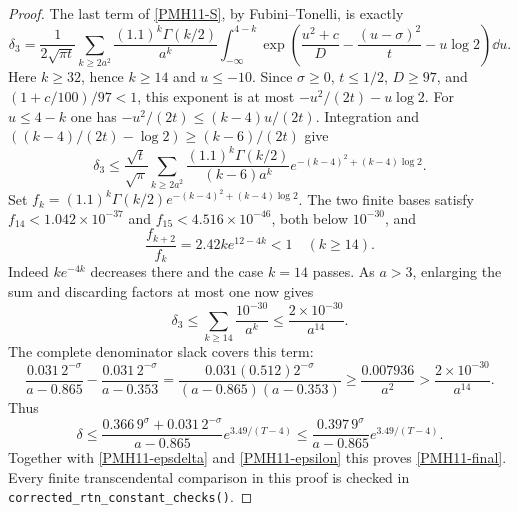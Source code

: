 \begin{proof}
The last term of \eqref{PMH11-S}, by Fubini--Tonelli, is exactly
\[
 \delta_3=\frac1{2\sqrt{\pi t}}
 \sum_{k\ge2a^2}\frac{(1.1)^k\Gamma(k/2)}{a^k}
 \int_{-\infty}^{4-k}
 \exp\left(\frac{u^2+c}{D}-\frac{(u-\sigma)^2}{t}
                          -u\log2\right)\dd u.
\]
Here $k\ge32$, hence $k\ge14$ and $u\le-10$. Since
$\sigma\ge0$, $t\le1/2$, $D\ge97$, and
$(1+c/100)/97<1$, this exponent is at most
$-u^2/(2t)-u\log2$. For $u\le4-k$ one has
$-u^2/(2t)\le(k-4)u/(2t)$. Integration and
$((k-4)/(2t)-\log2)\ge(k-6)/(2t)$ give
\[
 \delta_3\le\frac{\sqrt t}{\sqrt\pi}
 \sum_{k\ge2a^2}\frac{(1.1)^k\Gamma(k/2)}{(k-6)a^k}
            e^{-(k-4)^2+(k-4)\log2}.
\]
Set $f_k=(1.1)^k\Gamma(k/2)e^{-(k-4)^2+(k-4)\log2}$.
The two finite bases satisfy $f_{14}<1.042\times10^{-37}$ and
$f_{15}<4.516\times10^{-46}$, both below $10^{-30}$, and
\[
 \frac{f_{k+2}}{f_k}=2.42k e^{12-4k}<1\quad(k\ge14).
\]
Indeed $k e^{-4k}$ decreases there and the case $k=14$ passes.
As $a>3$, enlarging the sum and discarding factors at most one
now gives
\begin{equation}\label{PMH11-delta3}
 \delta_3\le\sum_{k\ge14}\frac{10^{-30}}{a^k}
       \le\frac{2\times10^{-30}}{a^{14}}.
\end{equation}
The complete denominator slack covers this term:
\[
 \frac{0.031\,2^{-\sigma}}{a-0.865}
 -\frac{0.031\,2^{-\sigma}}{a-0.353}
 =\frac{0.031(0.512)2^{-\sigma}}{(a-0.865)(a-0.353)}
 \ge\frac{0.007936}{a^2}
 >\frac{2\times10^{-30}}{a^{14}}.
\]
Thus
\[
 \delta\le\frac{0.366\,9^\sigma+0.031\,2^{-\sigma}}
                  {a-0.865}e^{3.49/(T-4)}
 \le\frac{0.397\,9^\sigma}{a-0.865}e^{3.49/(T-4)}.
\]
Together with \eqref{PMH11-epsdelta} and \eqref{PMH11-epsilon}
this proves \eqref{PMH11-final}. Every finite transcendental
comparison in this proof is checked in
\texttt{corrected\_rtn\_constant\_checks()}.
\end{proof}
